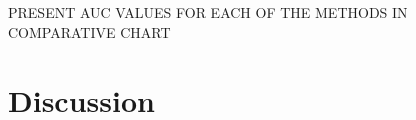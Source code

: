 \documentclass[12pt]{article}
\begin{document}
PRESENT AUC VALUES FOR EACH OF THE METHODS IN COMPARATIVE CHART

\section{Discussion}
\label{sec:disc}







\end{document}
